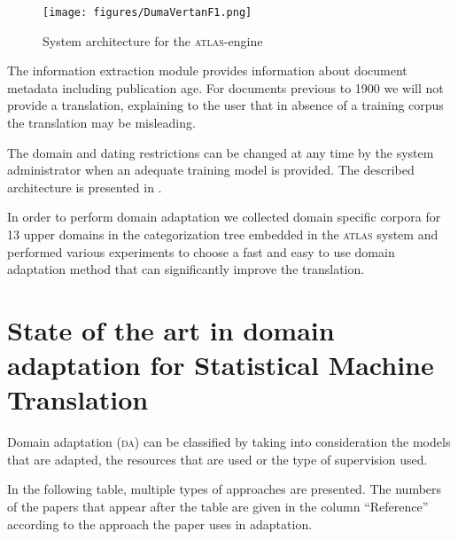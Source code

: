 \documentclass[output=paper]{LSP/langsci}
\begin{document}
\begin{figure}[h]
\texttt{[image: figures/DumaVertanF1.png]}
\caption{System architecture for the \textsc{atlas}-engine}
\label{fig:dumavertan:1}
\end{figure}

The information extraction module provides information about document me\-tadata including publication age. For documents previous to 1900 we will not provide a translation, explaining to the user that in absence of a training corpus the translation may be misleading.

The domain and dating restrictions can be changed at any time by the system administrator when an adequate training model is provided. The described architecture is presented in .

  In order to perform domain adaptation we collected domain specific corpora for 13 upper domains in the categorization tree embedded in the \textsc{atlas} system and performed various experiments to choose a fast and easy to use domain adaptation method that can significantly improve the translation. 

\section{State of the art in domain adaptation for Statistical Machine Translation}\label{sec:dumavertan:3}

Domain adaptation (\textsc{da}) can be classified by taking into consideration the models that are adapted, the resources that are used or the type of supervision used.

  In the following table, multiple types of approaches are presented. The numbers of the papers that appear after the table are given in the column ``Reference'' according to the approach the paper uses in adaptation.
\end{document}
